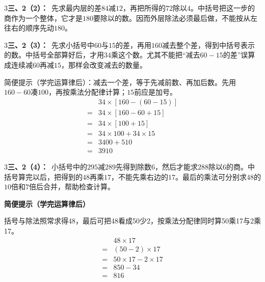 \documentclass[multi=snippet,border={5bp 20bp 5bp 5bp}]{standalone}
\newenvironment{snippet}[3]{\begin{minipage}{#1bp}\color{answerred}\fontsize{#2}{#3}\selectfont\raggedright}{\end{minipage}}
\begin{document}
\begin{snippet}{505}{11.5}{14}\begin{multicols}{3}\raggedcolumns \textbf{三、2（2）：}\ 先求最内层的差\(84\)\allowbreak 减\(12\)\allowbreak ，再把所得的\(72\)\allowbreak 除以\(4\)\allowbreak 。中括号把这一步的商作为一个整体，它才是\(180\)\allowbreak 要除以的数。因而外层除法必须最后做，不能按从左往右的顺序先动\(180\)\allowbreak 。\end{multicols}\end{snippet}
\begin{snippet}{505}{11.5}{14}\begin{multicols}{3}\raggedcolumns \textbf{三、2（3）：}\ 先求小括号中\(60\)\allowbreak 与\(15\)\allowbreak 的差，再用\(160\)\allowbreak 减去整个差，得到中括号表示的数。中括号全部算好后，才用\(34\)\allowbreak 乘这个数。尤其不能把“减去\(60-15\)\allowbreak 的差”误算成连续减\(60\)\allowbreak 再减\(15\)\allowbreak ，那样会改变减去的数量。\par 简便提示（学完运算律后）：减去一个差，等于先减前数、再加后数。先用\(160-60\)\allowbreak 凑\(100\)\allowbreak ，再按乘法分配律计算；\(15\)\allowbreak 前应是加号。\[\begin{aligned}&34\times[160-(60-15)]\\={}&34\times[160-60+15]\\={}&34\times[100+15]\\={}&34\times100+34\times15\\={}&3400+510\\={}&3910\end{aligned}\]\end{multicols}\end{snippet}
\begin{snippet}{505}{11.5}{14}\begin{multicols}{3}\raggedcolumns \textbf{三、2（4）：}\ 小括号中的\(295\)\allowbreak 减\(289\)\allowbreak 先得到除数\(6\)\allowbreak ，然后才能求\(288\)\allowbreak 除以\(6\)\allowbreak 的商。中括号算完以后，把得到的\(48\)\allowbreak 再乘\(17\)\allowbreak ，不能先乘右边的\(17\)\allowbreak 。最后的乘法可分别求\(48\)\allowbreak 的\(10\)\allowbreak 倍和\(7\)\allowbreak 倍后合并，帮助检查计算。\par\textbf{简便提示（学完运算律后）}\par 括号与除法照常求得48，最后可把48看成50少2，按乘法分配律同时算50乘17与2乘17。\[\begin{aligned}&48\times17\\={}&(50-2)\times17\\={}&50\times17-2\times17\\={}&850-34\\={}&816\end{aligned}\]\end{multicols}\end{snippet}
\end{document}
